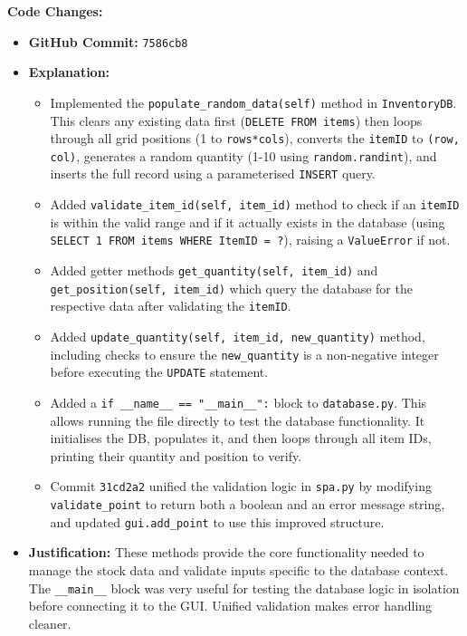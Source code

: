 \textbf{Code Changes:}
\begin{itemize}
	\item \textbf{GitHub Commit:} \verb|7586cb8|
	\item \textbf{Explanation:}
	\begin{itemize}
		\item Implemented the \verb|populate_random_data(self)| method in \verb|InventoryDB|. This clears any existing data first (\verb|DELETE FROM items|) then loops through all grid positions (1 to \verb|rows*cols|), converts the \verb|itemID| to \verb|(row, col)|, generates a random quantity (1-10 using \verb|random.randint|), and inserts the full record using a parameterised \verb|INSERT| query.
		\item Added \verb|validate_item_id(self, item_id)| method to check if an \verb|itemID| is within the valid range and if it actually exists in the database (using \verb|SELECT 1 FROM items WHERE ItemID = ?|), raising a \verb|ValueError| if not.
		\item Added getter methods \verb|get_quantity(self, item_id)| and \verb|get_position(self, item_id)| which query the database for the respective data after validating the \verb|itemID|.
		\item Added \verb|update_quantity(self, item_id, new_quantity)| method, including checks to ensure the \verb|new_quantity| is a non-negative integer before executing the \verb|UPDATE| statement.
		\item Added a \verb|if __name__ == "__main__":| block to \verb|database.py|. This allows running the file directly to test the database functionality. It initialises the DB, populates it, and then loops through all item IDs, printing their quantity and position to verify.
		\item Commit \verb|31cd2a2| unified the validation logic in \verb|spa.py| by modifying \verb|validate_point| to return both a boolean and an error message string, and updated \verb|gui.add_point| to use this improved structure.
	\end{itemize}
	\item \textbf{Justification:} These methods provide the core functionality needed to manage the stock data and validate inputs specific to the database context. The \verb|__main__| block was very useful for testing the database logic in isolation before connecting it to the GUI. Unified validation makes error handling cleaner.
\end{itemize}

